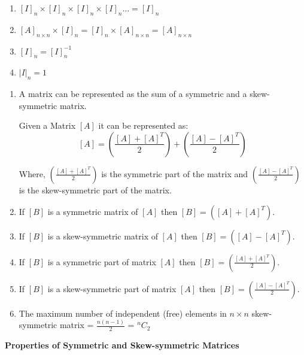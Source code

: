 \begin{enumerate}
    \item $[I]_n \times [I]_n \times [I]_n \times [I]_n \dots = [I]_n$

    \item $[A]_{n \times n} \times [I]_n = [I]_n \times [A]_{n \times n} = [A]_{n \times n}$

    \item $[I]_n = [I]^{-1}_n$

    \item $|I|_n = 1$
\end{enumerate}

\begin{impbox}{}
    \begin{enumerate}
        \item A matrix can be represented as the sum of a symmetric and a skew-symmetric matrix.

        Given a Matrix $[A]$ it can be represented as:
        $$[A] = \left( \frac{[A] + [A]^T}{2} \right) + \left( \frac{[A] - [A]^T}{2} \right)$$

        Where,
        $\left( \frac{[A] + [A]^T}{2} \right)$ is the symmetric part of the matrix and $\left( \frac{[A] - [A]^T}{2} \right)$ is the skew-symmetric part of the matrix.

        \item If $[B]$ is a symmetric matrix of $[A]$ then $[B] = ({[A] + [A]^T})$.

        \item If $[B]$ is a skew-symmetric matrix of $[A]$ then $[B] = ({[A] - [A]^T})$.

        \item If $[B]$ is a symmetric part of matrix $[A]$ then $[B] = \left( \frac{[A] + [A]^T}{2} \right)$.

        \item If $[B]$ is a skew-symmetric part of matrix $[A]$ then $[B] = \left( \frac{[A] - [A]^T}{2} \right)$.

        \item The maximum number of independent (free) elements in $n \times n$ skew-symmetric matrix = $\frac{n(n-1)}{2}$ = ${}^nC_2$
    \end{enumerate}
\end{impbox}

\textbf{Properties of Symmetric and Skew-symmetric Matrices}

